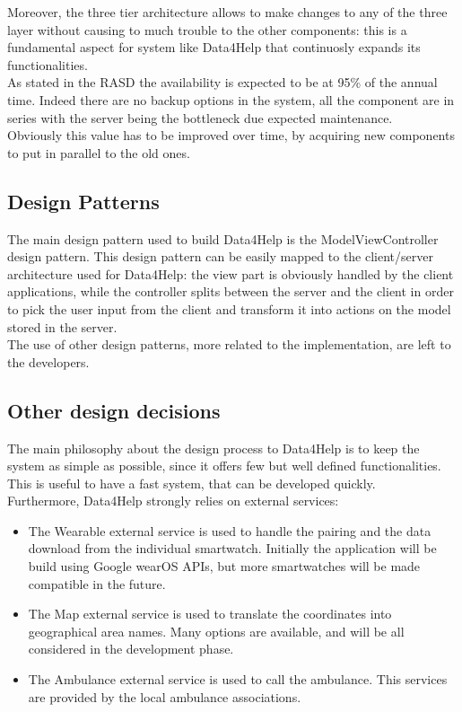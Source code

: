 Moreover, the three tier architecture allows to make changes to any of the three layer without causing to much trouble to the other components: this is a fundamental aspect for system like Data4Help that continuosly expands its functionalities.
\\

As stated in the RASD the availability is expected to be at 95\% of the annual time. Indeed there are no backup options in the system, all the component are in series with the server being the bottleneck due expected maintenance.\\
Obviously this value has to be improved over time, by acquiring new components to put in parallel to the old ones.

\subsection{Design Patterns}
The main design pattern used to build Data4Help is the ModelViewController design pattern.
This design pattern can be easily mapped to the client/server architecture used for Data4Help: the 
view part is obviously handled by the client applications, while the controller splits between the server and the client in order to pick the user input from the client and transform it into actions on the model stored in the server.
\\
The use of other design patterns, more related to the implementation, are left to the developers. 

\subsection{Other design decisions}
The main philosophy about the design process to Data4Help is to keep the system as simple as possible, since it offers few but well defined functionalities. This is useful to have a fast system, that can be developed quickly.\\
Furthermore, Data4Help strongly relies on external services:
\begin{itemize}
\item The Wearable external service is used to handle the pairing and the data download from the individual smartwatch. Initially the application will be build using Google wearOS APIs, but more smartwatches will be made compatible in the future.
\item The Map external service is used to translate the coordinates into geographical area names. Many options are available, and will be all considered in the development phase.
\item The Ambulance external service is used to call the ambulance. This services are provided by the local ambulance associations.
\end{itemize}


